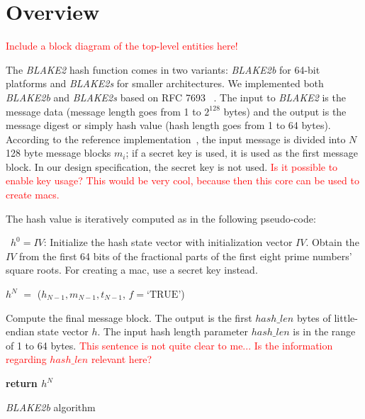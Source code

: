 \documentclass[%
	a4paper,
]
{article}
\newcommand{\todo}[1]{\textcolor{red}{#1}}
\begin{document}
\section{Overview}
\label{sec:overview}

\todo{Include a block diagram of the top-level entities here!}

The \emph{BLAKE2} hash function comes in two variants: \emph{BLAKE2b} for
64-bit platforms and \emph{BLAKE2s} for smaller architectures.
%
We implemented both \emph{BLAKE2b} and \emph{BLAKE2s} based on RFC 7693~%
\autocite{rfc7693}.	
%
The input to \emph{BLAKE2} is the message data (message
length goes from 1 to $2^{128}$ bytes) and the output is the message digest or
simply hash value (hash length goes from 1 to 64 bytes).
%
According to the reference implementation~\autocite{REF}, the input message is
divided into $N$ 128 byte message blocks $m_i$; if a secret key is used, it is
used as the first message block. In our design specification, the secret key is
not used. \todo{Is it possible to enable key usage? This would be very cool,
because then this core can be used to create \glspl{mac}.}

The hash value is iteratively computed as in the following pseudo-code:

\begin{algorithm}
\justifying

	\ $h^{0}=IV$: Initialize the hash state vector with initialization
		vector $IV$. Obtain the $IV$ from the first 64 bits of the fractional
		parts of the first eight prime numbers' square roots. For creating
		a \gls{mac}, use a secret key instead.

	\BlankLine
	

	\BlankLine
	

	$h^{N}$ $=$ ($h_{N-1}, m_{N-1},t_{N-1}$, $f=\textrm{`TRUE'} $) \

		Compute the final message block. The output is the first $hash\_len$
		bytes of little-endian state vector $h$. The input hash length parameter
		$hash\_len$ is in the range of 1 to 64 bytes.
		\todo{This sentence is not quite clear to me... Is the information
		regarding $hash\_len$ relevant here?}

	\BlankLine

	\textbf{return $h^{N}$}
	
	\caption{\emph{BLAKE2b} algorithm}
	\label{alg:bbs}
	
\end{algorithm}
\end{document}
